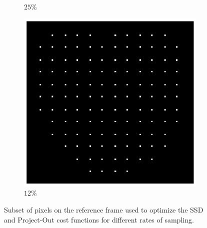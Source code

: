 \begin{figure}[t!]
\begin{subfigure}{0.16\textwidth}
		\caption{$25\%$}
		\label{fig:sampling_25}
	\end{subfigure}
	\begin{subfigure}{0.16\textwidth}
		\includegraphics[width=\textwidth]{figures/sampling_12.png}
		\caption{$12\%$}
		\label{fig:ini_12}
	\end{subfigure}
	\caption{Subset of pixels on the reference frame used to optimize the SSD and Project-Out cost functions for different rates of sampling.}
    \label{fig:sampling_masks}
\end{figure}


